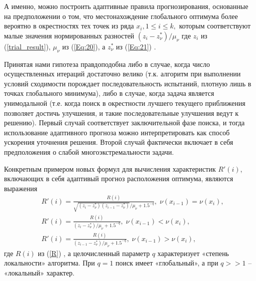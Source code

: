 \documentclass[
11pt,%
tightenlines,%
twoside,%
onecolumn,%
nofloats,%
nobibnotes,%
nofootinbib,%
superscriptaddress,%
noshowpacs,%
centertags]%
{revtex4}
\begin{document}

А именно, можно построить адаптивные правила прогнозирования, основанные на предположении о том, что местонахождение глобального оптимума более вероятно в окрестностях тех точек из ряда $x_i, 1 \leq i \leq k,$ которым соответствуют малые значения нормированных разностей $(z_i-z_\nu^*)/\mu_\nu$
где $z_i$ из (\ref{trial_result}), $\mu_\nu$ из (\ref{Eq:20}), а $z_\nu^*$ из (\ref{Eq:21}) .

Принятая нами гипотеза правдоподобна либо в случае, когда число осуществленных итераций достаточно велико (т.к. алгоритм при выполнении условий сходимости порождает последовательность испытаний, плотную лишь в точках глобального минимума), либо в случае, когда задача является унимодальной (т.е. когда поиск в окрестности лучшего текущего приближения позволяет достичь улучшения, и такие последовательные улучшения ведут к решению). Первый случай соответствует заключительной фазе поиска, и тогда использование адаптивного прогноза можно интерпретировать как способ ускорения уточнения решения. Второй случай фактически включает в себя предположения о слабой многоэкстремальности задачи.

Конкретным примером новых формул для вычисления характеристик $R'(i)$, включающих в себя адаптивый прогноз расположения оптимума, являются выражения
\begin{eqnarray}\label{lR}
& R'(i) = \frac{R(i)}{\sqrt{(z_i-z_\nu^*)(z_{i-1}-z_\nu^*)}/\mu_\nu+1.5^{-q}}, \; \nu(x_{i-1})=\nu(x_{i}),\nonumber\\
& R'(i) = \frac{R(i)}{(z_i-z_\nu^*)/\mu_\nu+1.5^{-q}}, \; \nu(x_{i-1})<\nu(x_{i}),\\
& R'(i) = \frac{R(i)}{(z_{i-1}-z_\nu^*)/\mu_\nu+1.5^{-q}}, \; \nu(x_{i-1})>\nu(x_{i}),\nonumber
\end{eqnarray}
где $R(i)$ из (\ref{R}) , а целочисленный параметр $q$ характеризует «степень локальности» алгоритма. При $q=1$ поиск имеет «глобальный», а при $q>>1$ -- «локальный» характер. 
\end{document}
